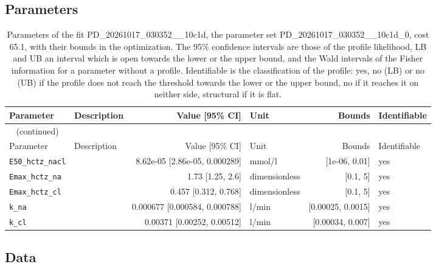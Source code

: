 \subsection{Parameters}

\begin{longtable}{llrlrl}
\caption{Parameters of the fit PD\_20261017\_030352\_\_10c1d, the parameter set PD\_20261017\_030352\_\_10c1d\_0, cost 65.1, with their bounds in the optimization. The 95\% confidence intervals are those of the profile likelihood, LB and UB an interval which is open towards the lower or the upper bound, and the Wald intervals of the Fisher information for a parameter without a profile. Identifiable is the classification of the profile: yes, no (LB) or no (UB) if the profile does not reach the threshold towards the lower or the upper bound, no if it reaches it on neither side, structural if it is flat.}\label{tab:parameters:PD_20261017_030352__10c1d} \\
\toprule
Parameter & Description & Value [95\% CI] & Unit & Bounds & Identifiable \\
\midrule
\endfirsthead
\multicolumn{6}{l}{\small\tablename~\thetable{} (continued)} \\
\toprule
Parameter & Description & Value [95\% CI] & Unit & Bounds & Identifiable \\
\midrule
\endhead
\bottomrule
\endlastfoot
\texttt{E50\_hctz\_nacl} &  & 8.62e-05 [2.86e-05, 0.000289] & mmol/l & [1e-06, 0.01] & yes \\
\texttt{Emax\_hctz\_na} &  & 1.73 [1.25, 2.6] & dimensionless & [0.1, 5] & yes \\
\texttt{Emax\_hctz\_cl} &  & 0.457 [0.312, 0.768] & dimensionless & [0.1, 5] & yes \\
\texttt{k\_na} &  & 0.000677 [0.000584, 0.000788] & l/min & [0.00025, 0.0015] & yes \\
\texttt{k\_cl} &  & 0.00371 [0.00252, 0.00512] & l/min & [0.00034, 0.007] & yes \\
\end{longtable}

\subsection{Data}

